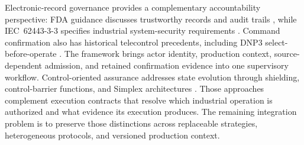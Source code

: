 Electronic-record governance provides a complementary accountability
perspective: FDA guidance discusses trustworthy records and audit trails
\cite{part11}, while IEC~62443-3-3 specifies industrial system-security
requirements \cite{iec62443-3-3}. Command confirmation also has historical
telecontrol precedents, including DNP3 select-before-operate
\cite{ieee1815dnp3}. The framework brings actor identity, production context,
source-dependent admission, and retained confirmation evidence into one
supervisory workflow. Control-oriented assurance addresses state evolution
through shielding, control-barrier functions, and Simplex architectures
\cite{alshiekh2018shielding,ames2017cbf,sha2001simplex}. Those approaches
complement execution contracts that resolve which industrial operation is
authorized and what evidence its execution produces. The remaining
integration problem is to preserve those distinctions across replaceable
strategies, heterogeneous protocols, and versioned production context.
